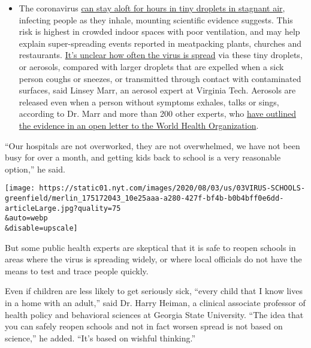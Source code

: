 \begin{itemize}
  \begin{itemize}
  \tightlist
  \item
    The coronavirus
    \href{https://www.nytimes.com/2020/07/04/health/239-experts-with-one-big-claim-the-coronavirus-is-airborne.html?action=click\&pgtype=Article\&state=default\&region=MAIN_CONTENT_3\&context=storylines_faq}{can
    stay aloft for hours in tiny droplets in stagnant air}, infecting
    people as they inhale, mounting scientific evidence suggests. This
    risk is highest in crowded indoor spaces with poor ventilation, and
    may help explain super-spreading events reported in meatpacking
    plants, churches and restaurants.
    \href{https://www.nytimes.com/2020/07/06/health/coronavirus-airborne-aerosols.html?action=click\&pgtype=Article\&state=default\&region=MAIN_CONTENT_3\&context=storylines_faq}{It's
    unclear how often the virus is spread} via these tiny droplets, or
    aerosols, compared with larger droplets that are expelled when a
    sick person coughs or sneezes, or transmitted through contact with
    contaminated surfaces, said Linsey Marr, an aerosol expert at
    Virginia Tech. Aerosols are released even when a person without
    symptoms exhales, talks or sings, according to Dr. Marr and more
    than 200 other experts, who
    \href{https://academic.oup.com/cid/article/doi/10.1093/cid/ciaa939/5867798}{have
    outlined the evidence in an open letter to the World Health
    Organization}.
  \end{itemize}
\end{itemize}

``Our hospitals are not overworked, they are not overwhelmed, we have
not been busy for over a month, and getting kids back to school is a
very reasonable option,'' he said.

\texttt{[image: https://static01.nyt.com/images/2020/08/03/us/03VIRUS-SCHOOLS-greenfield/merlin\_175172043\_10e25aaa-a280-427f-bf4b-b0b4bff0e6dd-articleLarge.jpg?quality=75\\\&auto=webp\\\&disable=upscale]}

But some public health experts are skeptical that it is safe to reopen
schools in areas where the virus is spreading widely, or where local
officials do not have the means to test and trace people quickly.

Even if children are less likely to get seriously sick, ``every child
that I know lives in a home with an adult,'' said Dr. Harry Heiman, a
clinical associate professor of health policy and behavioral sciences at
Georgia State University. ``The idea that you can safely reopen schools
and not in fact worsen spread is not based on science,'' he added.
``It's based on wishful thinking.''

